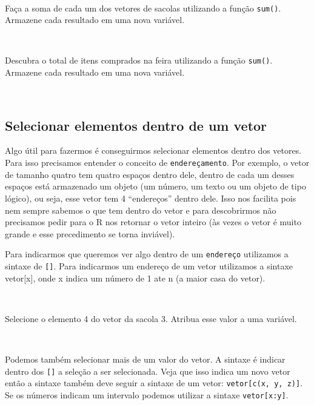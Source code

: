 \documentclass[]{book}
\theoremstyle{definition}
\theoremstyle{definition}
\theoremstyle{definition}
\theoremstyle{remark}
\let\BeginKnitrBlock\begin \let\EndKnitrBlock\end
\begin{document}
~
\BeginKnitrBlock{exercise}
\protect\hypertarget{exr:unnamed-chunk-30}{}{\label{exr:unnamed-chunk-30} }Faça a soma de cada um dos vetores de sacolas utilizando a função \texttt{sum()}. Armazene cada resultado em uma nova variável.
\EndKnitrBlock{exercise}

~

\BeginKnitrBlock{exercise}
\protect\hypertarget{exr:unnamed-chunk-31}{}{\label{exr:unnamed-chunk-31} }Descubra o total de itens comprados na feira utilizando a função \texttt{sum()}. Armazene cada resultado em uma nova variável.
\EndKnitrBlock{exercise}

~

\hypertarget{selecionar-elementos-dentro-de-um-vetor}{%
\subsection{Selecionar elementos dentro de um vetor}\label{selecionar-elementos-dentro-de-um-vetor}}

Algo útil para fazermos é conseguirmos selecionar elementos dentro dos vetores. Para isso precisamos entender o conceito de \texttt{endereçamento}. Por exemplo, o vetor de tamanho quatro tem quatro espaços dentro dele, dentro de cada um desses espaços está armazenado um objeto (um número, um texto ou um objeto de tipo lógico), ou seja, esse vetor tem 4 ``endereços'' dentro dele. Isso nos facilita pois nem sempre sabemos o que tem dentro do vetor e para descobrirmos não precisamos pedir para o R nos retornar o vetor inteiro (às vezes o vetor é muito grande e esse precedimento se torna inviável).

Para indicarmos que queremos ver algo dentro de um \texttt{endereço} utilizamos a sintaxe de \texttt{{[}{]}}. Para indicarmos um endereço de um vetor utilizamos a sintaxe vetor{[}x{]}, onde x indica um número de 1 ate n (a maior casa do vetor).

~

\BeginKnitrBlock{exercise}
\protect\hypertarget{exr:unnamed-chunk-32}{}{\label{exr:unnamed-chunk-32} }Selecione o elemento 4 do vetor da sacola 3. Atribua esse valor a uma variável.
\EndKnitrBlock{exercise}

~

Podemos também selecionar mais de um valor do vetor. A sintaxe é indicar dentro dos \texttt{{[}{]}} a seleção a ser selecionada. Veja que isso indica um novo vetor então a sintaxe também deve seguir a sintaxe de um vetor: \texttt{vetor{[}c(x,\ y,\ z){]}}. Se os números indicam um intervalo podemos utilizar a sintaxe \texttt{vetor{[}x:y{]}}.
\end{document}

